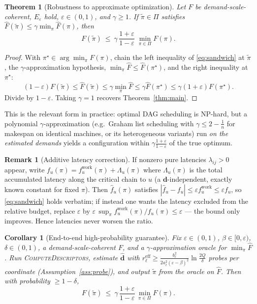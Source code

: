 \documentclass{amsart}
\newtheorem{theorem}{Theorem}
\newtheorem{corollary}{Corollary}
\theoremstyle{definition}
\newtheorem{remark}{Remark}
\begin{document}
\begin{theorem}[Robustness to approximate optimization]\label{thm:approxalg}
Let $F$ be demand-scale-coherent, $E_\varepsilon$ hold, $\varepsilon\in(0,1)$,
and $\gamma\ge1$. If $\tilde\pi\in\Pi$ satisfies
$\widehat F(\tilde\pi)\le\gamma\min_{\pi}\widehat F(\pi)$, then
\begin{equation}\label{eq:approxalg}
F(\tilde\pi)\ \le\ \gamma\,\frac{1+\varepsilon}{1-\varepsilon}\;\min_{\pi\in\Pi}F(\pi).
\end{equation}
\end{theorem}

\begin{proof}
With $\pi^\star\in\arg\min_\pi F(\pi)$, chain the left inequality of
\eqref{eq:sandwich} at $\tilde\pi$, the $\gamma$-approximation hypothesis,
$\min_\pi\widehat F\le\widehat F(\pi^\star)$, and the right inequality at
$\pi^\star$:
\[
(1-\varepsilon)F(\tilde\pi)\le\widehat F(\tilde\pi)\le\gamma\min_\pi\widehat F
\le\gamma\widehat F(\pi^\star)\le\gamma(1+\varepsilon)F(\pi^\star).
\]
Divide by $1-\varepsilon$. Taking $\gamma=1$ recovers Theorem~\ref{thm:main}.
\end{proof}

This is the relevant form in practice: optimal DAG scheduling is NP-hard, but a
polynomial $\gamma$-approximation (e.g.\ Graham list scheduling with
$\gamma\le 2-\tfrac1n$ for makespan on identical machines, or its heterogeneous
variants) run \emph{on the estimated demands} yields a configuration within
$\gamma\frac{1+\varepsilon}{1-\varepsilon}$ of the true optimum.

\begin{remark}[Additive latency correction]\label{rem:latency}
If nonzero pure latencies $\lambda_{ij}>0$ appear, write
$f_u(\pi)=f_u^{\mathrm{work}}(\pi)+\Lambda_u(\pi)$ where $\Lambda_u(\pi)$ is the
total accumulated latency along the critical chain to $u$ (a
$\mathbf d$-independent, exactly known constant for fixed $\pi$). Then
$\widehat f_u(\pi)$ satisfies $|\widehat f_u-f_u|\le\varepsilon f_u^{\mathrm{work}}
\le\varepsilon f_u$, so \eqref{eq:sandwich} holds verbatim; if instead one wants
the latency excluded from the relative budget, replace $\varepsilon$ by
$\varepsilon\,\sup_\pi f_u^{\mathrm{work}}(\pi)/f_u(\pi)\le\varepsilon$ — the
bound only improves. Hence latencies never worsen the ratio.
\end{remark}

\begin{corollary}[End-to-end high-probability guarantee]\label{cor:e2e}
Fix $\varepsilon\in(0,1)$, $\beta\in[0,\varepsilon)$, $\delta\in(0,1)$, a
demand-scale-coherent $F$, and a $\gamma$-approximation oracle for
$\min_\pi\widehat F$. Run \textsc{ComputeDescriptors}, estimate
$\widehat{\mathbf d}$ with
$r_\ell^{\mathrm{eff}}\ge\frac{b_\ell^2}{2a_\ell^2(\varepsilon-\beta)^2}\ln\frac{2Q}{\delta}$
probes per coordinate (Assumption~\ref{ass:probe}), and output
$\tilde\pi$ from the oracle on $\widehat F$. Then with probability $\ge1-\delta$,
\[
F(\tilde\pi)\ \le\ \gamma\,\frac{1+\varepsilon}{1-\varepsilon}\,\min_{\pi\in\Pi}F(\pi).
\]
\end{corollary}
\end{document}
